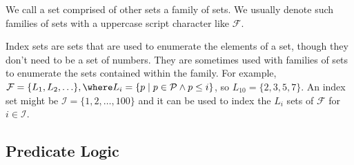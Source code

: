 We call a set comprised of other sets a family of sets. We usually
denote such families of sets with a uppercase script character like
\(\mathcal{F}\).

Index sets are sets that are used to enumerate the elements of a set,
though they don't need to be a set of numbers. They are sometimes used
with families of sets to enumerate the sets contained within the family.
For example,
\(\mathcal{F} = \{L_1, L_2, \ldots\}, \where L_i = \{p \mid p \in \mathcal{P} \land p \leq i\}\),
so \(L_{10} = \{2,3,5,7\}\). An index set might be
\(\mathcal{I} = \{1,2,\ldots,100\}\) and it can be used to index the
\(L_i\) sets of \(\mathcal{F}\) for \(i \in \mathcal{I}\).

\hypertarget{predicate-logic}{%
\subsection{Predicate Logic}\label{predicate-logic}}

